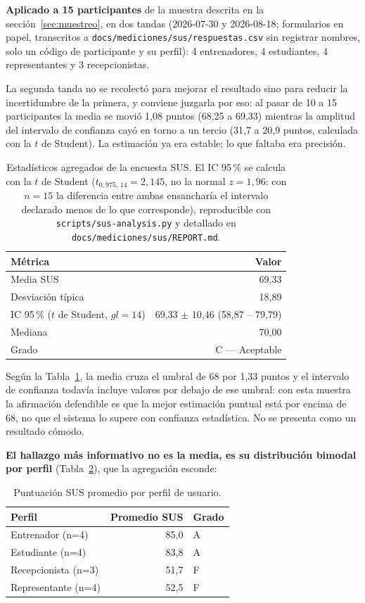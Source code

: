 \documentclass[11pt,a4paper]{article}
\newcommand{\ruta}[1]{\texttt{\footnotesize #1}}
\begin{document}
\textbf{Aplicado a 15 participantes} de la muestra descrita en la
sección~\ref{sec:muestreo}, en dos tandas (2026-07-30 y
2026-08-18; formularios en papel, transcritos a
\ruta{docs/mediciones/sus/respuestas.csv} sin registrar nombres, solo
un código de participante y su perfil): 4 entrenadores, 4 estudiantes,
4 representantes y 3 recepcionistas.

La segunda tanda no se recolectó para mejorar el resultado sino para
reducir la incertidumbre de la primera, y conviene juzgarla por eso: al
pasar de 10 a 15 participantes la media se movió 1,08 puntos (68,25 a
69,33) mientras la amplitud del intervalo de confianza cayó en torno a
un tercio (31,7 a 20,9 puntos, calculada con la $t$ de Student). La
estimación ya era estable; lo que faltaba era precisión.

\begin{table}[htbp]
\centering
\caption{Estadísticos agregados de la encuesta SUS. El IC 95\,\% se
calcula con la $t$ de Student ($t_{0{,}975,\,14} = 2{,}145$, no la
normal $z=1{,}96$: con $n=15$ la diferencia entre ambas ensancharía el
intervalo declarado menos de lo que corresponde), reproducible con
\ruta{scripts/sus-analysis.py} y detallado en
\ruta{docs/mediciones/sus/REPORT.md}.}
\label{tab:sus-agregado}
\begin{tabular}{@{}lr@{}}
\toprule
\textbf{Métrica} & \textbf{Valor} \\
\midrule
Media SUS & 69,33 \\
Desviación típica & 18,89 \\
IC 95\,\% ($t$ de Student, $gl=14$) & 69,33 $\pm$ 10,46 \quad (58,87 -- 79,79) \\
Mediana & 70,00 \\
Grado & C --- Aceptable \\
\bottomrule
\end{tabular}
\end{table}

Según la Tabla~\ref{tab:sus-agregado}, la media cruza el umbral de 68
por 1,33 puntos y el intervalo de confianza
todavía incluye valores por debajo de ese umbral: con esta muestra la
afirmación defendible es que la mejor estimación puntual está por encima de
68, no que el sistema lo supere con confianza estadística. No se presenta
como un resultado cómodo.

\textbf{El hallazgo más informativo no es la media, es su distribución
bimodal por perfil} (Tabla~\ref{tab:sus-perfil}), que la agregación
esconde:

\begin{table}[htbp]
\centering
\caption{Puntuación SUS promedio por perfil de usuario.}
\label{tab:sus-perfil}
\begin{tabular}{@{}lrl@{}}
\toprule
\textbf{Perfil} & \textbf{Promedio SUS} & \textbf{Grado} \\
\midrule
Entrenador (n=4) & 85,0 & A \\
Estudiante (n=4) & 83,8 & A \\
Recepcionista (n=3) & 51,7 & F \\
Representante (n=4) & 52,5 & F \\
\bottomrule
\end{tabular}
\end{table}
\end{document}
